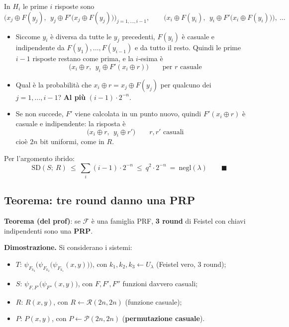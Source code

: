 In \(H_i\) le prime \(i\) risposte sono
\[
\Big(x_j \oplus F(y_j),\ \ y_j \oplus F'\big(x_j \oplus F(y_j)\big)\Big)_{j = 1, \dots, i-1}, \qquad \Big(x_i \oplus F(y_i),\ \ y_i \oplus F'\big(x_i \oplus F(y_i)\big)\Big), \ \dots
\]
\begin{itemize}
  \item Siccome \(y_i\) è diversa da tutte le \(y_j\) precedenti, \(F(y_i)\) è casuale e indipendente da \(F(y_1), \dots, F(y_{i-1})\) e da tutto il resto. Quindi le prime \(i-1\) risposte restano come prima, e la \(i\)-esima è
  \[
  \big(x_i \oplus r,\ \ y_i \oplus F'(x_i \oplus r)\big) \qquad \text{per } r \text{ casuale}
  \]
  \item Qual è la probabilità che \(x_i \oplus r = x_j \oplus F(y_j)\) per qualcuno dei \(j = 1, \dots, i-1\)? \textbf{Al più} \((i - 1) \cdot 2^{-n}\).
  \item Se non succede, \(F'\) viene calcolata in un punto nuovo, quindi \(F'(x_i \oplus r)\) è casuale e indipendente: la risposta è
  \[
  \big(x_i \oplus r,\ \ y_i \oplus r'\big) \qquad r, r' \text{ casuali}
  \]
  cioè \(2n\) bit uniformi, come in \(R\).
\end{itemize}
Per l'argomento ibrido:
\[
\text{SD}(S;\ R) \ \le\ \sum_i (i - 1) \cdot 2^{-n} \ \le\ q^2 \cdot 2^{-n} \ =\ \text{negl}(\lambda) \qquad \blacksquare
\]

\subsection{Teorema: tre round danno una PRP}

\textbf{Teorema (del prof)}: se \(\mathcal{F}\) è una famiglia PRF, \textbf{3 round} di Feistel con chiavi indipendenti sono una \textbf{PRP}.

\textbf{Dimostrazione.} Si considerano i sistemi:
\begin{itemize}
  \item \(T\): \(\psi_{F_{k_3}}\big(\psi_{F_{k_2}}\big(\psi_{F_{k_1}}(x, y)\big)\big)\), con \(k_1, k_2, k_3 \leftarrow U_\lambda\) (Feistel vero, 3 round);
  \item \(S\): \(\psi_{F, F'}\big(\psi_{F''}(x, y)\big)\), con \(F, F', F''\) funzioni davvero casuali;
  \item \(R\): \(R(x, y)\), con \(R \leftarrow \mathcal{R}(2n, 2n)\) (funzione casuale);
  \item \(P\): \(P(x, y)\), con \(P \leftarrow \mathcal{P}(2n, 2n)\) (\textbf{permutazione casuale}).
\end{itemize}

